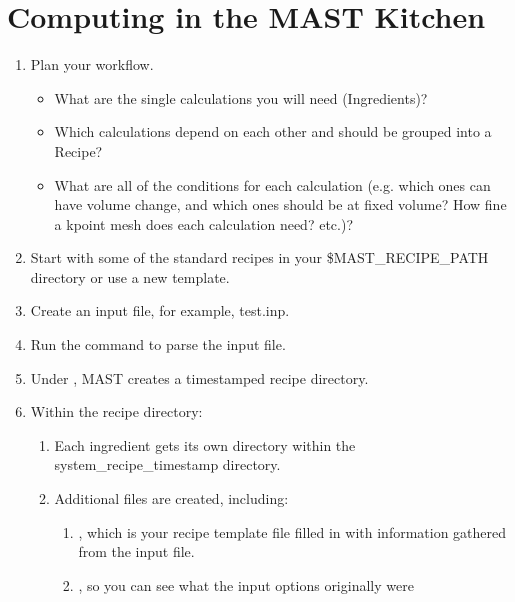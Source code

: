 \documentclass[letterpaper,10pt,english]{sphinxmanual}
\begin{document}
\section{Computing in the MAST Kitchen}
\label{0_0_introduction:computing-in-the-mast-kitchen}\begin{enumerate}
\item {} 
Plan your workflow.
\begin{itemize}
\item {} 
What are the single calculations you will need (Ingredients)?

\item {} 
Which calculations depend on each other and should be grouped into a Recipe?

\item {} 
What are all of the conditions for each calculation (e.g. which ones can have volume change, and which ones should be at fixed volume? How fine a kpoint mesh does each calculation need? etc.)?

\end{itemize}

\item {} 
Start with some of the standard recipes in your \$MAST\_RECIPE\_PATH directory or use a new template.

\item {} 
Create an input file, for example, test.inp.

\item {} 
Run the command  to parse the input file.

\item {} 
Under , MAST creates a timestamped recipe directory.

\item {} 
Within the recipe directory:
\begin{enumerate}
\item {} 
Each ingredient gets its own directory within the system\_recipe\_timestamp directory.

\item {} 
Additional files are created, including:
\begin{enumerate}
\item {} 
, which is your recipe template file filled in with information gathered from the input  file.

\item {} 
, so you can see what the input options originally were


\end{enumerate}
\end{enumerate}
\end{enumerate}
\end{document}
